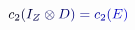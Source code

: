 \documentclass[12pt]{article}
\begin{document}
\makeatletter
\renewcommand*{\@textcolor}[3]{%
  \protect\leavevmode
  \begingroup
    \color#1{#2}#3%
  \endgroup
}
\makeatother
\begin{displaymath}
\mathcolor[RGB]{0,0,15}{c} _ { \mathcolor[RGB]{0,0,30}{2} } \mathcolor[RGB]{0,0,45}{(} \mathcolor[RGB]{0,0,60}{I} _ { \mathcolor[RGB]{0,0,75}{Z} } \mathcolor[RGB]{0,0,90}{\otimes} \mathcolor[RGB]{0,0,105}{D} \mathcolor[RGB]{0,0,120}{)} \mathcolor[RGB]{0,0,135}{=} \mathcolor[RGB]{0,0,150}{c} _ { \mathcolor[RGB]{0,0,165}{2} } \mathcolor[RGB]{0,0,180}{(} \mathcolor[RGB]{0,0,195}{E} \mathcolor[RGB]{0,0,210}{)}
\end{displaymath}
\end{document}
